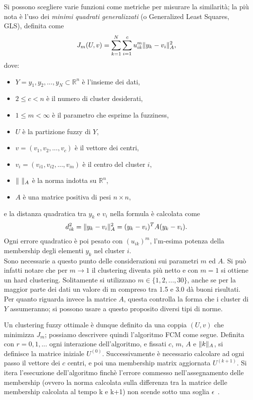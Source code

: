 \documentclass[oneside, openany]{book}
\DeclarePairedDelimiter{\norma}{\lVert}{\rVert}
\begin{document}
		Si possono scegliere varie funzioni come metriche per misurare la similarità; la più nota è l'uso dei \textit{minimi quadrati generalizzati} (o Generalized Least Squares, GLS), definita come
		\[
			J_m(U, v)=\sum_{k=1}^{N}\sum_{i=1}^{c}u_{ik}^m\norma{y_k-v_i}^2_A\text{,}
		\]
		dove:
		\begin{itemize}
			\item $Y = {y_1, y_2, ..., y_N} \subset \mathbb{R}^n$ è l'insieme dei dati, 
			\item $2 \leq c < n$ è il numero di cluster desiderati,
			\item $1 \leq m <\infty$ è il parametro che esprime la fuzziness,
			\item $U$ è la partizione fuzzy di $Y$,
			\item $v = (v_1, v_2, ..., v_c)$ è il vettore dei centri,
			\item $v_i = (v_{i1}, v_{i2}, ..., v_{in})$ è il centro del cluster $i$,
			\item $\norma{\textit{ }}_A$ è la norma indotta su $\mathbb{R}^n$,
			\item $A$ è una matrice positiva di pesi $n\times n$,
		\end{itemize}
		e la distanza quadratica tra $y_k$ e $v_i$ nella formula è calcolata come
		\[
			d^2_{ik} = \norma{y_k-v_i}^2_A = (y_k-v_i)^TA(y_k-v_i)\text{.}
		\] 	
		Ogni errore quadratico è poi pesato con $(u_{ik})^m$, l'm-esima potenza della membership degli elementi $y_k$ nel cluster $i$.\\
		Sono necessarie a questo punto delle considerazioni sui parametri $m$ ed $A$. Si può infatti notare che per $m\rightarrow 1$ il clustering diventa più netto e con $m=1$ si ottiene un hard clustering. Solitamente si utilizzano $m \in\{1,2,...,30\}$, anche se per la maggior parte dei dati un valore di m compreso tra 1.5 e 3.0 dà buoni risultati. \\
		Per quanto riguarda invece la matrice $A$, questa controlla la forma che i cluster di $Y$ assumeranno; si possono usare a questo proposito diversi tipi di norme.
		
		Un clustering fuzzy ottimale è dunque definito da una coppia $(U, v)$ che minimizza $J_m$; possiamo descrivere quindi l'algoritmo FCM come segue.
		Definita con $r=0,1, ...$ ogni interazione dell'algoritmo, e fissati $c$, $m$, $A$ e $\norma{k}_A$, si definisce la matrice iniziale $U^{(0)}$. Successivamente è necessario calcolare ad ogni passo il vettore dei $c$ centri, e poi una membership matrix aggiornata $U^{(k+1)}$. Si itera l'esecuzione dell'algoritmo finchè l'errore commesso nell'assegnamento delle membership (ovvero la norma calcolata sulla differenza tra la matrice delle membership calcolata al tempo k e k+1) non scende sotto una soglia $\epsilon$~\cite{bib:fcm}.
		
\end{document}
